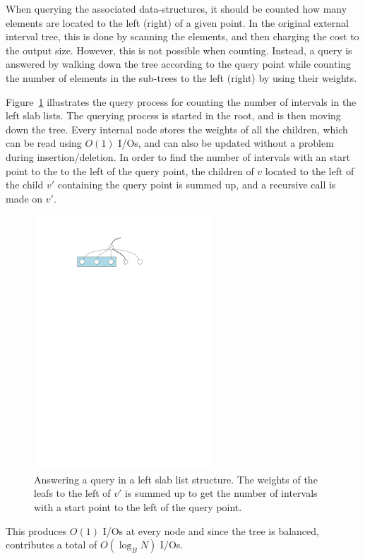 \documentclass[a4paper,12pt]{article}
\begin{document}
When querying the associated data-structures, it should be counted how many elements are located to the left (right) of a given point. In the original external interval tree, this is done by scanning the elements, and then charging the cost to the output size. However, this is not possible when counting. Instead, a query is answered by walking down the tree according to the query point while counting the number of elements in the sub-trees to the left (right) by using their weights.

Figure~\ref{fig:searching:query} illustrates the query process for counting the number of intervals in the left slab lists. The querying process is started in the root, and is then moving down the tree. Every internal node stores the weights of all the children, which can be read using $O(1)$ I/Os, and can also be updated without a problem during insertion/deletion. In order to find the number of intervals with an start point to the to the left of the query point, the children of $v$ located to the left of the child $v'$ containing the query point is summed up, and a recursive call is made on $v'$.
\begin{figure}[h!]
  \centering
  \includegraphics[width=0.6\textwidth]{images/query}
  \caption{Answering a query in a left slab list structure. The weights of the leafs to the left of $v'$ is summed up to get the number of intervals with a start point to the left of the query point.}
  \label{fig:searching:query}
\end{figure}
This produces $O(1)$ I/Os at every node and since the tree is balanced, contributes a total of $O(\log_B N)$ I/Os.
\end{document}
